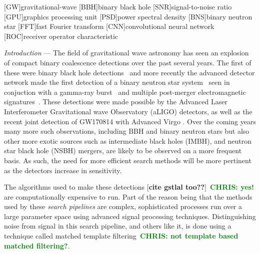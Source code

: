 \documentclass[%
 amsmath,amssymb,
 aps,
 twocolumn,
 prl,
 reprint,
floatfix,
]{revtex4-1}
\newcommand{\chris}[1]{\textbf{\textcolor{green}{CHRIS: #1}}}
\begin{document}
[GW]{gravitational-wave}
[BBH]{binary black hole}
[SNR]{signal-to-noise ratio}
[GPU]{graphics processing unit}
[PSD]{power spectral density}
[BNS]{binary neutron star}
[FFT]{fast Fourier transform}
[CNN]{convolutional neural network}
[ROC]{receiver operator characteristic}


%
%

%
%
\textit{Introduction} --- 
%
%
The field of gravitational wave astronomy has seen an explosion of compact
binary coalescence detections over the past several years. The first of these
were binary black hole detections~\cite{PhysRevLett.116.061102,
PhysRevLett.116.241103, PhysRevLett.118.221101} and more recently the advanced
detector network made the first detection of a binary neutron star
system~\cite{PhysRevLett.119.161101} seen in conjuction with a gamma-ray
burst~\cite{2017arXiv171005834L,2017arXiv171005446G,2017arXiv171005449S} and
multiple post-merger electromagnetic signatures~\cite{2017arXiv171005833L}.
These detections were made possible by the Advanced Laser Interferometer
Gravitational wave Observatory (aLIGO) detectors, as well as the recent joint
detection of GW170814 with Advanced Virgo \cite{PhysRevLett.119.141101}. Over
the coming years many more such observations, including \ac{BBH} and binary
neutron stars but also other more exotic sources such as intermediate black
holes (IMBH), and neutron star black hole (NSBH) mergers, are likely to be
observed on a more frequent basis. As such, the need for more efficient search
methods will be more pertinent as the detectors increase in sensitivity.

%
%
The algorithms used to make these detections \cite{0264-9381-33-21-215004}
[\textbf{cite gstlal too??}]~\chris{yes!} are computationally expensive to run.
Part of the reason being that the methods used by these \textit{search
pipelines} are complex, sophisticated processes run over a large parameter
space using advanced signal processing techniques. Distinguishing noise from
signal in this search pipeline, and others like it, is done using a technique
called matched template filtering~\chris{not template based matched
filtering?}. 
\end{document}
